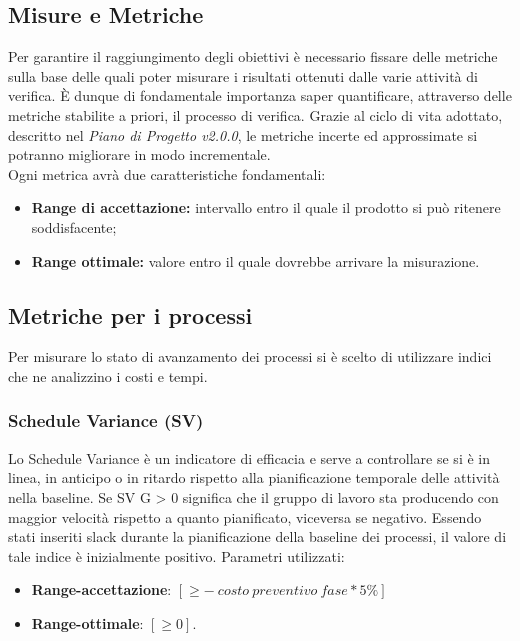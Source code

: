 \subsection{Misure e Metriche}
\label{sezione 3.6}
Per garantire il raggiungimento degli obiettivi è necessario fissare delle metriche sulla base delle quali poter misurare i risultati ottenuti dalle varie attività di verifica. È dunque di fondamentale importanza saper quantificare, attraverso delle metriche stabilite a priori, il processo di verifica. Grazie al ciclo di vita adottato, descritto nel \textit{Piano di Progetto v2.0.0}, le metriche incerte ed approssimate si potranno migliorare in modo incrementale.\\
Ogni metrica avrà due caratteristiche fondamentali:
\begin{itemize}
	\item \textbf{Range di accettazione:} intervallo entro il quale il prodotto si può ritenere soddisfacente;
	\item \textbf{Range ottimale:} valore entro il quale dovrebbe arrivare la misurazione.
\end{itemize}


\subsection{Metriche per i processi}
\label{sezione 3.7}
Per misurare lo stato di avanzamento dei processi si è scelto di utilizzare indici che ne analizzino i costi e
tempi.
\subsubsection{Schedule Variance (SV)}
Lo Schedule Variance è un indicatore di efficacia e serve a controllare se si è in linea, in anticipo o in ritardo rispetto alla pianificazione temporale delle attività nella \gls{baseline}.
Se SV G > 0 significa che il gruppo di lavoro sta producendo con maggior velocità rispetto a quanto pianificato, viceversa se negativo.
Essendo stati inseriti \gls{slack} durante la pianificazione della \gls{baseline} dei processi, il valore di tale indice è inizialmente positivo.
Parametri utilizzati:
\begin{itemize}
	\item \textbf{Range-accettazione}: $\left[  \geq - \: costo \: preventivo \: fase * 5 \% \right]$
	\item \textbf{Range-ottimale}: $\left[\geq 0\right]$.
\end{itemize}
